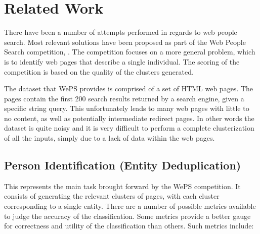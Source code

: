\chapter{Related Work}
\label{chapter:project-desc}

There have been a number of attempts performed in regards to web people search.
Most relevant solutions have been proposed as part of the Web People Search competition,
\cite{weps3-eval}\cite{weps2-eval}. The competition focuses on a more general
problem, which is to identify web pages that describe a single individual. The
scoring of the competition is based on the quality of the clusters generated.

The dataset that WePS provides is comprised of a set of HTML web pages.
The pages contain the first 200 \cite{weps3-eval} search results returned by a search engine, given
a specific string query. This unfortunately leads to many web pages with
little to no content, as well as potentially intermediate redirect pages.
In other words the dataset is quite noisy and it is very difficult to perform
a complete clusterization of all the inputs, simply due to a lack of data within
the web pages.

\section{Person Identification (Entity Deduplication)}
\label{sec:person-id}
This represents the main task brought forward by the WePS \cite{weps2-eval} competition.
It consists of generating the relevant clusters of pages, with each cluster corresponding
to a single entity. There are a number of possible metrics available to judge the accuracy
of the classification. Some metrics provide a better gauge for correctness and utility of
the classification than others. Such metrics include:

